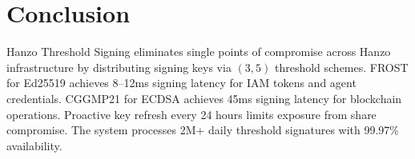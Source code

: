 \documentclass[11pt]{article}
\begin{document}
\section{Conclusion}
\label{sec:conclusion}

Hanzo Threshold Signing eliminates single points of compromise across Hanzo
infrastructure by distributing signing keys via $(3, 5)$ threshold schemes.
FROST for Ed25519 achieves 8--12ms signing latency for IAM tokens and agent
credentials. CGGMP21 for ECDSA achieves 45ms signing latency for blockchain
operations. Proactive key refresh every 24 hours limits exposure from share
compromise. The system processes 2M+ daily threshold signatures with 99.97\%
availability.
\end{document}
